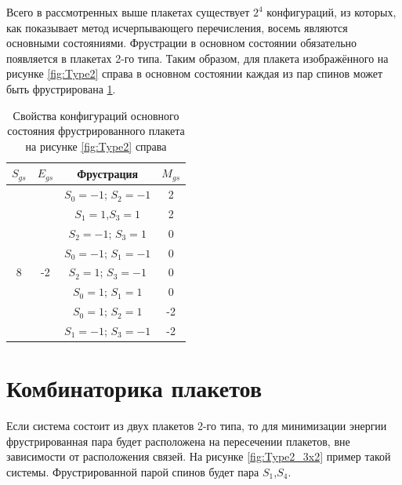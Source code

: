 \documentclass[utf8, babel, sor, jor, amsmath, amssymb, reprint]{elsarticle} %
\begin{document}
Всего в рассмотренных выше плакетах существует $2^4$ конфигураций, из которых, как показывает метод исчерпывающего перечисления, восемь являются основными состояниями. 
Фрустрации в основном состоянии обязательно появляется в плакетах 2-го типа. 
Таким образом, для плакета изображённого на рисунке \ref{fig:Type2} справа в основном состоянии каждая из пар спинов может быть фрустрирована \ref{tab:Strunags}.

\begin{table}[H]
	\centering
	\begin{tabular}{|c|c|c|c|}
		
		\hline
		$S_{gs}$	& $E_{gs}$    & Фрустрация  &   $M_{gs}$   \\
		\hline
		& & 	$S_0=-1$; $S_2=-1$ & 2   \\ 	\cline{3-4}
		& & $S_1=1$,$S_3=1$        & 2\\ 	\cline{3-4}
		& &  $S_2=-1$; $S_3=1$     & 0    \\ \cline{3-4} 
		&  & $S_0=-1$; $S_1=-1$ &	0  \\ 
		\cline{3-4} 
		8	\multirow{3}{*}{} & -2 \multirow{3}{*}{} & $S_2=1$;  $S_3=-1$     &  0\\ \cline{3-4}	
		& & $S_0=1$;  $S_1=1$      &  0\\ \cline{3-4}
		& &	$S_0=1$;  $S_2=1$      &  -2\\ \cline{3-4}
		& &	$S_1=-1$; $S_3=-1$     & -2\\ \hline
		
	\end{tabular}
	\caption{Свойства конфигураций основного состояния фрустрированного плакета на рисунке \ref{fig:Type2} справа}
	\label{tab:Strunags}
\end{table}

\section{Комбинаторика плакетов}

  
Если система состоит из двух плакетов 2-го типа, то для минимизации энергии фрустрированная пара будет расположена на пересечении плакетов, вне зависимости от расположения связей. На рисунке \ref{fig:Type2_3x2} пример такой системы. Фрустрированной парой спинов будет пара $S_1$,$S_4$.
\end{document}
